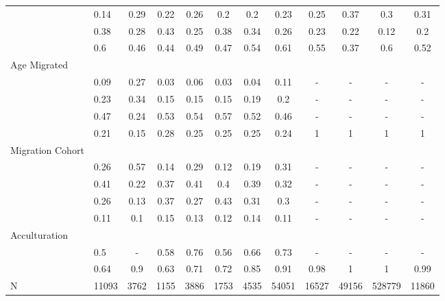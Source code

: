 \documentclass[
]{article}
\begin{document}
\begin{landscape}
\begin{table}[ht]
\begin{tabular}{>{\raggedright\arraybackslash}p{3.2cm}|lcccccc|cccc}
  \multicolumn{1}{>{\raggedleft\arraybackslash}p{2.2cm}|}{\makebox[2.2cm][r]{Lives Alone }}& 0.14 & 0.29 & 0.22 & 0.26 & 0.2 & 0.2 & 0.23 & 0.25 & 0.37 & 0.3 & 0.31 \\ 
  \multicolumn{1}{>{\raggedleft\arraybackslash}p{2.9cm}|}{\makebox[2.9cm][r]{Lives with Child }}& 0.38 & 0.28 & 0.43 & 0.25 & 0.38 & 0.34 & 0.26 & 0.23 & 0.22 & 0.12 & 0.2 \\ 
  \multicolumn{1}{>{\raggedleft\arraybackslash}p{3.4cm}|}{\makebox[3.4cm][r]{Married/Cohabiting }}& 0.6 & 0.46 & 0.44 & 0.49 & 0.47 & 0.54 & 0.61 & 0.55 & 0.37 & 0.6 & 0.52 \\ 
  Age Migrated &  &  &  &  &  &  &  &  &  &  &  \\ 
  \multicolumn{1}{>{\raggedleft\arraybackslash}p{2.4cm}|}{\makebox[2.4cm][r]{Less than 15 }}& 0.09 & 0.27 & 0.03 & 0.06 & 0.03 & 0.04 & 0.11 & - & - & - & - \\ 
  \multicolumn{1}{>{\raggedleft\arraybackslash}p{1.6cm}|}{\makebox[1.6cm][r]{15 - 23 }}& 0.23 & 0.34 & 0.15 & 0.15 & 0.15 & 0.19 & 0.2 & - & - & - & - \\ 
  \multicolumn{1}{>{\raggedleft\arraybackslash}p{1.6cm}|}{\makebox[1.6cm][r]{24 - 49 }}& 0.47 & 0.24 & 0.53 & 0.54 & 0.57 & 0.52 & 0.46 & - & - & - & - \\ 
  \multicolumn{1}{>{\raggedleft\arraybackslash}p{2.6cm}|}{\makebox[2.6cm][r]{50 and Above }}& 0.21 & 0.15 & 0.28 & 0.25 & 0.25 & 0.25 & 0.24 & 1 & 1 & 1 & 1 \\ 
  Migration Cohort &  &  &  &  &  &  &  &  &  &  &  \\ 
  \multicolumn{1}{>{\raggedleft\arraybackslash}p{2.3cm}|}{\makebox[2.3cm][r]{Before 1965 }}& 0.26 & 0.57 & 0.14 & 0.29 & 0.12 & 0.19 & 0.31 & - & - & - & - \\ 
  \multicolumn{1}{>{\raggedleft\arraybackslash}p{2.2cm}|}{\makebox[2.2cm][r]{1965 - 1979 }}& 0.41 & 0.22 & 0.37 & 0.41 & 0.4 & 0.39 & 0.32 & - & - & - & - \\ 
  \multicolumn{1}{>{\raggedleft\arraybackslash}p{2.2cm}|}{\makebox[2.2cm][r]{1980 - 1999 }}& 0.26 & 0.13 & 0.37 & 0.27 & 0.43 & 0.31 & 0.3 & - & - & - & - \\ 
  \multicolumn{1}{>{\raggedleft\arraybackslash}p{2.1cm}|}{\makebox[2.1cm][r]{After 1999 }}& 0.11 & 0.1 & 0.15 & 0.13 & 0.12 & 0.14 & 0.11 & - & - & - & - \\ 
  Acculturation &  &  &  &  &  &  &  &  &  &  &  \\ 
  \multicolumn{1}{>{\raggedleft\arraybackslash}p{1.6cm}|}{\makebox[1.6cm][r]{Citizen }}& 0.5 & - & 0.58 & 0.76 & 0.56 & 0.66 & 0.73 & - & - & - & - \\ 
  \multicolumn{1}{>{\raggedleft\arraybackslash}p{3cm}|}{\makebox[3cm][r]{English Speakers }}& 0.64 & 0.9 & 0.63 & 0.71 & 0.72 & 0.85 & 0.91 & 0.98 & 1 & 1 & 0.99 \\ 
  N & 11093 & 3762 & 1155 & 3886 & 1753 & 4535 & 54051 & 16527 & 49156 & 528779 & 11860 \\ 
   \hline
\end{tabular}
\endgroup
\end{table}


\end{landscape}
\end{document}
